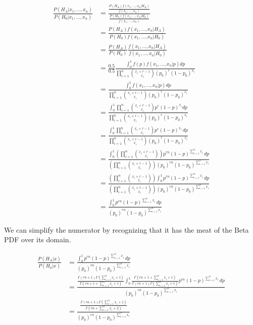 \documentclass[
  letterpaper,
  DIV=11,
  numbers=noendperiod]{scrreprt}
\begin{document}
\[
\begin{aligned}
\frac{P(H_A|x_1,...,x_n)}{P(H_0|x_1,...,x_n)} &= \frac{\frac{P(H_A) f(x_1,...,x_n|H_A)}{f(x_1,...,x_n)}}{\frac{P(H_0) f(x_1,...,x_n|H_0)}{f(x_1,...,x_n)}} \\
&= \frac{P(H_A) f(x_1,...,x_n|H_A)}{P(H_0) f(x_1,...,x_n|H_0)} \\
&= \frac{P(H_A)}{P(H_0)} \frac{f(x_1,...,x_n|H_A)}{f(x_1,...,x_n|H_0)} \\
&= \frac{0.5}{0.5} \frac{\int _0^1 f(p) f(x_1,...,x_n|p)dp}{\prod_{i=1}^n \binom{x_i + r - 1}{x_i} (p_0)^r (1 - p_0)^{x_i}} \\
&= \frac{\int _0^1 f(x_1,...,x_n|p)dp}{\prod_{i=1}^n \binom{x_i + r - 1}{x_i} (p_0)^r (1 - p_0)^{x_i}} \\
&= \frac{\int _0^1 \prod_{i=1}^n \binom{x_i + r - 1}{x_i} p^r (1 - p)^{x_i} dp}{\prod_{i=1}^n \binom{x_i + r - 1}{x_i} (p_0)^r (1 - p_0)^{x_i}} \\
&= \frac{\int_0^1 \prod_{i=1}^n \binom{x_i + r - 1}{x_i} p^r (1 - p)^{x_i} \, dp}{\prod_{i=1}^n \binom{x_i + r - 1}{x_i} (p_0)^r (1 - p_0)^{x_i}} \\
&= \frac{\int_0^1 \left( \prod_{i=1}^n \binom{x_i + r - 1}{x_i} \right) p^{rn} (1 - p)^{\sum_{i=1}^n x_i} \, dp}{\left( \prod_{i=1}^n \binom{x_i + r - 1}{x_i} \right) (p_0)^{rn} (1 - p_0)^{\sum_{i=1}^n x_i}} \\
&= \frac{ \left( \prod_{i=1}^n \binom{x_i + r - 1}{x_i} \right) \int_0^1 p^{rn} (1 - p)^{\sum_{i=1}^n x_i} \, dp}{\left( \prod_{i=1}^n \binom{x_i + r - 1}{x_i} \right) (p_0)^{rn} (1 - p_0)^{\sum_{i=1}^n x_i}} \\
&= \frac{\int_0^1 p^{rn} (1 - p)^{\sum_{i=1}^n x_i} \, dp}{(p_0)^{rn} (1 - p_0)^{\sum_{i=1}^n x_i}}
\end{aligned}
\]

We can simplify the numerator by recognizing that it has the meat of the
Beta PDF over its domain.

\[
\begin{aligned}
\frac{P(H_A | x)}{P(H_0 | x)} &= \frac{\int_0^1 p^{rn} (1 - p)^{\sum_{i=1}^n x_i} \, dp}{(p_0)^{rn} (1 - p_0)^{\sum_{i=1}^n x_i}} \\
&= \frac{\frac{\Gamma(rn + 1) \Gamma(\sum_{i=1}^n x_i + 1)}{\Gamma(rn + 1 + \sum_{i=1}^n x_i + 1) } \int_0^1 \frac{\Gamma(rn + 1 + \sum_{i=1}^n x_i + 1)}{\Gamma(rn + 1) \Gamma(\sum_{i=1}^n x_i + 1)}p^{rn} (1 - p)^{\sum_{i=1}^n x_i} \, dp}{(p_0)^{rn} (1 - p_0)^{\sum_{i=1}^n x_i}} \\
&= \frac{\frac{\Gamma(rn + 1) \Gamma\left(\sum_{i=1}^n x_i + 1\right)}{\Gamma\left(rn + \sum_{i=1}^n x_i + 2\right)}}{(p_0)^{rn} (1 - p_0)^{\sum_{i=1}^n x_i}}
\end{aligned}
\]
\end{document}
